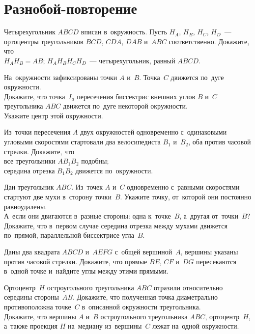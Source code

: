 
\section*{Разнобой-повторение}


\begin{problems}

\item
Четырехугольник $ABCD$ вписан в~окружность.
Пусть $H_A$, $H_B$, $H_C$, $H_D$~--- ортоцентры треугольников
$BCD$, $CDA$, $DAB$ и~$ABC$ соответственно.
Докажите, что
\\
\subproblem $H_A H_B = AB$;
\qquad
\subproblem $H_A H_B H_C H_D$~--- четырехугольник, равный $ABCD$.

\item
На~окружности зафиксированы точки $A$ и~$B$.
Точка~$C$ движется по~дуге окружности.
\\
\subproblem
Докажите, что точка~$I_a$ пересечения биссектрис внешних углов $B$ и~$C$
треугольника $ABC$ движется по~дуге некоторой окружности.
\\
\subproblem
Укажите центр этой окружности.

\item
Из~точки пересечения $A$ двух окружностей одновременно с~одинаковыми угловыми
скоростями стартовали два велосипедиста $B_1$ и~$B_2$, оба против часовой
стрелки.
Докажите, что
\\
\subproblem
все треугольники $A B_1 B_2$ подобны;
\\
\subproblem
середина отрезка $B_1 B_2$ движется по~окружности.

\item
\subproblem
Дан треугольник $ABC$.
Из~точек $A$ и~$C$ одновременно с~равными скоростями стартуют две мухи
в~сторону точки~$B$.
Укажите точку, от~которой они постоянно равноудалены.
\\
\subproblem
А~если они двигаются в~разные стороны: одна к~точке~$B$, а~другая от~точки~$B$?
\\
\subproblem
Докажите, что в~первом случае середина отрезка между мухами движется по~прямой,
параллельной биссектрисе угла~$B$.

\item
Даны два квадрата $ABCD$ и~$AEFG$ с~общей вершиной~$A$, вершины указаны против
часовой стрелки.
Докажите, что прямые $BE$, $CF$ и~$DG$ пересекаются в~одной точке и~найдите
углы между этими прямыми.

\item
\subproblem
Ортоцентр~$H$ остроугольного треугольника $ABC$ отразили относительно середины
стороны~$AB$.
Докажите, что полученная точка диаметрально противоположна точке~$C$
в~описанной окружности треугольника.
\\
\subproblem
Докажите, что вершины $A$ и~$B$ остроугольного треугольника $ABC$,
ортоцентр~$H$, а~также проекция $H$ на~медиану из~вершины~$C$ лежат на~одной
окружности.

\end{problems}


